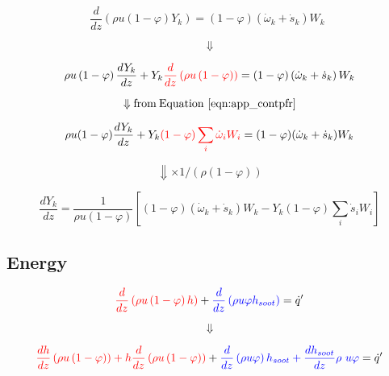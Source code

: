 \begin{equation*}
	\frac{d}{dz}\left(\rho u(1-\varphi)Y_k\right)=\left(1-\varphi\right)\left({\dot{\omega}}_k+{\dot{s}}_k\right)W_k\ \ 
\end{equation*}

\begin{equation*}
	\Downarrow
\end{equation*}

\begin{equation*}
	\rho u\left(1-\varphi\right)\frac{dY_k}{dz}
	+
	Y_k
	\color{red}
	\frac{d}{dz}\left(\rho u\left(1-\varphi\right)\right)
	\color{black}
	=
	\left(1-\varphi\right)\left({\dot{\omega}}_k+{\dot{s}}_k\right)W_k
\end{equation*}

\begin{equation*}
	\Downarrow \mathrm{from \: Equation~\eqref{eqn:app_contpfr}}
\end{equation*}

\begin{equation*}
	\rho u(1-\varphi)
	\frac{dY_k}{dz}
	+
	Y_k
	\color{red}
	(1-\varphi)\sum_{i}{{\dot{\omega}}_iW_i}
	\color{black}
	=
	(1-\varphi)({\dot{\omega}}_k+{\dot{s}}_k)W_k
\end{equation*}


\begin{equation*}
	\Downarrow \times 1/(\rho (1-\varphi))
\end{equation*}

\begin{equation}
	\frac{dY_k}{dz}=\frac{1}{\rho u(1-\varphi)}\left[(1-\varphi)({\dot{\omega}}_k+{\dot{s}}_k)W_k-Y_k(1-\varphi)\sum_{i}{{\dot{s}}_iW_i}\right]
	\label{eqn:app_speciespfr}
\end{equation}

\subsection{Energy}

\begin{equation*}
	\color{red}
	\frac{d}{dz}\left(\rho u\left(1-\varphi\right)h\right)
	\color{black}
	+
	\color{blue}
	\frac{d}{dz}\left(\rho u\varphi h_{soot}\right)
	\color{black}
	={\dot{q}}^\prime
\end{equation*}

\begin{equation*}
	\Downarrow
\end{equation*}


\begin{equation*}
	\color{red}
	\frac{dh}{dz}\left(\rho u\left(1-\varphi\right)\right)+h\frac{d}{dz}\left(\rho u\left(1-\varphi\right)\right)
	\color{black}
	+
	\color{blue}
	\frac{d}{dz}\left(\rho u\varphi\right)h_{soot}+\frac{dh_{soot}}{dz}\rho\ u\varphi
	\color{black}
	={\dot{q}}^\prime
\end{equation*}

